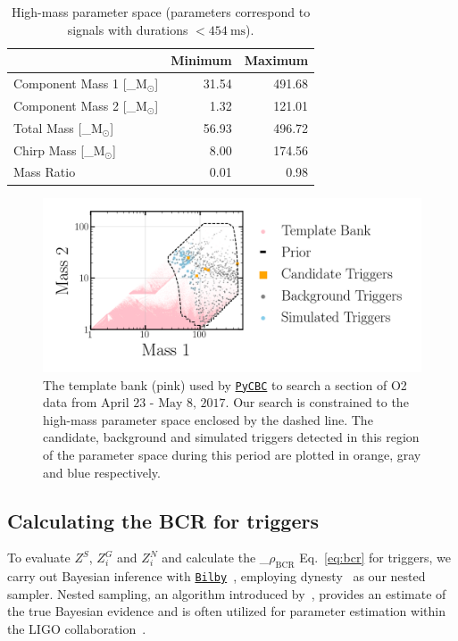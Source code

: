 \documentclass[%
 nofootinbib,
 amsmath,amssymb,
 aps,
 twocolumn,
 superscriptaddress
]{revtex4-2}
\newcommand{\bilby}{{\sc \href{https://lscsoft.docs.ligo.org/bilby/}{\texttt{Bilby}}}\xspace}
\newcommand{\dynesty}{{\sc dynesty}\xspace}
\newcommand{\pycbc}{{\sc \href{https://pycbc.org/}{\texttt{PyCBC}}}\xspace}
\newcommand{\mathcmd}[1]{{\sc \relax\ifmmode#1\else $#1$\fi}\xspace}
\newcommand{\bcr}{\mathcmd{\rho_\text{BCR}}}
\newcommand{\msun}{\mathcmd{\text{M}_\odot}}
\begin{document}
\begin{table}[t]

\caption[BBH parameters correspond to duration $<454\ \text{ms}$]{\label{tab:parameters}High-mass parameter space (parameters correspond to signals with durations $<454 \ \text{ms}$). }
\centering
\begin{tabular}{lrr}
\toprule
  & Minimum & Maximum\\
\midrule
Component Mass 1 [\msun] & 31.54 & 491.68\\
Component Mass 2 [\msun] & 1.32 & 121.01\\
Total Mass [\msun] & 56.93 & 496.72\\
Chirp Mass [\msun] & 8.00 & 174.56\\
Mass Ratio & 0.01 & 0.98\\
\end{tabular}
\end{table}



\begin{figure}[!ht]

{\centering \includegraphics[width=0.75\linewidth]{images/template_bank.png}

}
\caption[High-mass BCR search space.]{The template bank (pink) used by \pycbc to search a section of O2 data from $\text{April 23 - May 8, 2017}$. Our search is constrained to the high-mass parameter space enclosed by the dashed line. The candidate, background and simulated triggers detected in this region of the parameter space during this period are plotted in orange, gray and blue respectively.}\label{fig:templateBank}
\end{figure}


\subsection{Calculating the BCR for triggers}
To evaluate $Z^S$, $Z^G_i$ and $Z^N_i$ and calculate the \bcr Eq.~\ref{eq:bcr} for triggers, we carry out Bayesian inference with \bilby~\cite{bilby, bilby_pipe}, employing \dynesty~\cite{dynesty} as our nested sampler. Nested sampling, an algorithm introduced by~\citet{skilling2004, skilling2006}, provides an estimate of the true Bayesian evidence and is often utilized for parameter estimation within the LIGO collaboration~\cite{bilby, bilby_paper, pbilby_paper}.
\end{document}
